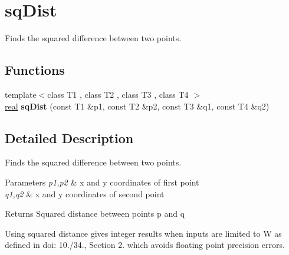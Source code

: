 \hypertarget{group__sqDist}{}\section{sq\+Dist}
\label{group__sqDist}


Finds the squared difference between two points.  


\subsection*{Functions}
\begin{DoxyCompactItemize}
\item 
\mbox{\label{group__sqDist_ga1825deef099379c7bf2f3f628b6a2079}} 
{\footnotesize template$<$class T1 , class T2 , class T3 , class T4 $>$ }\\\mbox{\hyperlink{typedefs_8cpp_a58a0c7cf2501f4492da833421be92547}{real}} {\bfseries sq\+Dist} (const T1 \&p1, const T2 \&p2, const T3 \&q1, const T4 \&q2)
\end{DoxyCompactItemize}


\subsection{Detailed Description}
Finds the squared difference between two points. 


\begin{DoxyParams}{Parameters}
{\em p1,p2} & x and y coordinates of first point \\
\hline
{\em q1,q2} & x and y coordinates of second point \\
\hline
\end{DoxyParams}
\begin{DoxyReturn}{Returns}
Squared distance between points p and q
\end{DoxyReturn}
Using squared distance gives integer results when inputs are limited to W as defined in doi\+: 10./34., Section 2. which avoids floating point precision errors. 